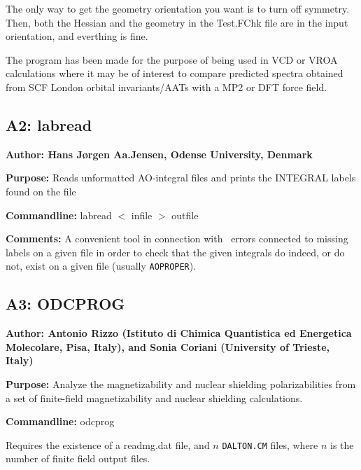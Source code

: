 The only way to get the geometry orientation you want is to turn
        off symmetry. 
        Then, both the Hessian and the geometry in the Test.FChk file are
        in the input orientation, and everthing is fine.

The program has been made for the purpose of being used in VCD or
VROA 
calculations where it may be of interest to compare predicted spectra
obtained from SCF London orbital invariants/AATs with a MP2 or DFT force field.

\subsection*{A2: labread}

\noindent
{\large\bf Author: \normalsize\large Hans J\o rgen Aa.Jensen,
Odense University, Denmark}

\smallskip

\noindent 
{\bf Purpose:} Reads unformatted AO-integral files and prints the
INTEGRAL labels found on the file

\smallskip
\noindent
{\bf Commandline:} labread $<$ infile $>$ outfile

\smallskip
\noindent
{\bf Comments:}  A convenient tool in connection with \siraba\ errors
connected to missing labels on a given file in order to check that the
given integrals do indeed, or do not, exist on a given file (usually
\verb|AOPROPER|). 

\subsection*{A3: ODCPROG}

\noindent
{\large\bf Author: \normalsize\large Antonio Rizzo (Istituto di
Chimica Quantistica ed Energetica Molecolare, Pisa, Italy), and
Sonia Coriani (University of Trieste, Italy)}

\smallskip

\noindent 
{\bf Purpose:} Analyze the magnetizability and nuclear shielding
polarizabilities from a set of finite-field magnetizability and
nuclear shielding calculations.

\smallskip
\noindent
{\bf Commandline:} odcprog

Requires the existence of a readmg.dat file, and $n$ \verb|DALTON.CM| files,
where $n$ is the number of finite field output files.

